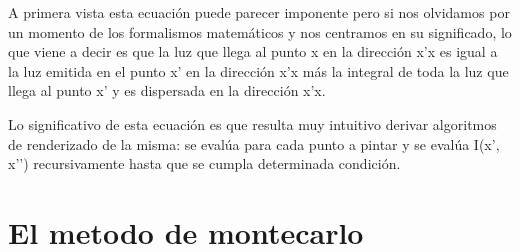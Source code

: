 A primera vista esta ecuación puede parecer imponente pero si nos olvidamos por un momento de los formalismos matemáticos y nos centramos en su significado, lo que viene a decir es que la luz que llega al punto x en la dirección x'x es igual a la luz emitida en el punto x’ en la dirección x'x más la integral de toda la luz que llega al punto x’ y es dispersada en la dirección x'x.

Lo significativo de esta ecuación es que resulta muy intuitivo derivar algoritmos de renderizado de la misma: se evalúa para cada punto a pintar y se evalúa I(x’, x’’) recursivamente hasta que se cumpla determinada condición.

\clearpage

\section{El metodo de montecarlo}

\clearpage

